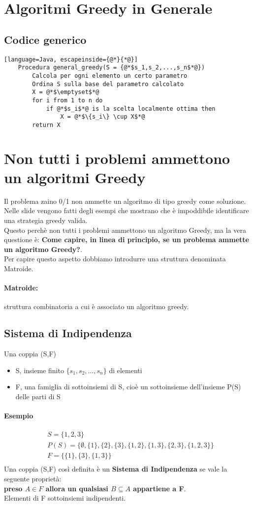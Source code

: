 \section{Algoritmi Greedy in Generale}
\subsection{Codice generico}
\begin{lstlisting}[language=Java, escapeinside={@*}{*@}]
    Procedura general_greedy(S = {@*$s_1,s_2,...,s_n$*@})
        Calcola per ogni elemento un certo parametro
        Ordina S sulla base del parametro calcolato
        X = @*$\emptyset$*@
        for i from 1 to n do
            if @*$s_i$*@ is la scelta localmente ottima then
                X = @*$\{s_i\} \cup X$*@
        return X
\end{lstlisting}
\section{Non tutti i problemi ammettono un algoritmi Greedy}
Il problema zaino 0/1 non ammette un algoritmo di tipo greedy come soluzione.
Nelle slide vengono fatti degli esempi che mostrano che è impoddibile identificare
una strategia greedy valida.\\
Questo perchè non tutti i problemi ammettono un algoritmo Greedy, ma la vera questione
è: \textbf{Come capire, in linea di principio, se un problema ammette un algoritmo Greedy?}.\\
Per capire questo aspetto dobbiamo introdurre una struttura denominata Matroide.
\paragraph*{Matroide:} struttura combinatoria a cui è associato un algoritmo greedy.
\subsection{Sistema di Indipendenza}
Una coppia (S,F)
\begin{itemize}
    \item S, insieme finito $\{s_1, s_2, \dots, s_n\}$ di elementi
    \item F, una famiglia di sottoinsiemi di S, cioè un sottoinsieme dell'insieme P(S)
    delle parti di S
\end{itemize}
\paragraph*{Esempio} 
\begin{align*}
    &S = \{1,2,3\}\\
    &P(S) = \{\emptyset, \{1\},\{2\},\{3\},\{1,2\},\{1,3\},\{2,3\},\{1,2,3\}\}\\
    &F=\{\{1\},\{3\},\{1,3\}\}\\
\end{align*}
Una coppia (S,F) così definita è un \textbf{Sistema di Indipendenza} se vale la seguente
proprietà:\\
\textbf{preso $A \in F$ allora un qualsiasi $B \subseteq A$ appartiene a F}.\\
Elementi di F \ra sottoinsiemi indipendenti.\\
